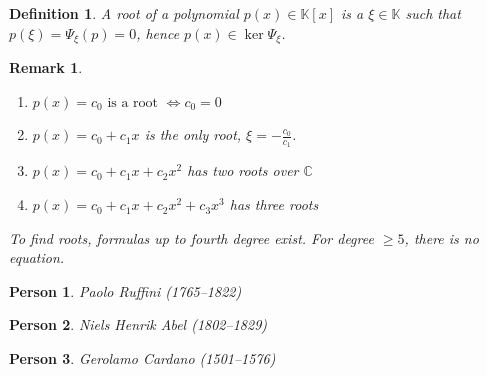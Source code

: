 \documentclass[a4paper]{article}
\newcounter{lecref}[section]
\numberwithin{lecref}{section}
\newtheorem{definition}[lecref]{Definition}
\newtheorem*{Remark}{Remark}
\newtheorem*{Person}{Person}
\begin{document}
\begin{definition}
  A \emph{root of a polynomial} $p(x) \in \mathbb K[x]$ is a $\xi \in \mathbb K$ such that $p(\xi) = \Psi_{\xi}(p) = 0$,
  hence $p(x) \in \ker{\Psi_{\xi}}$.
\end{definition}

\begin{Remark}
  \begin{enumerate}
    \item $p(x) = c_0 \text{ is a root } \iff c_0 = 0$
    \item $p(x) = c_0 + c_1 x$ is the only root, $\xi = -\frac{c_0}{c_1}$.
    \item $p(x) = c_0 + c_1 x + c_2 x^2$ has two roots over $\mathbb C$
    \item $p(x) = c_0 + c_1 x + c_2 x^2 + c_3 x^3$ has three roots
  \end{enumerate}

  To find roots, formulas up to fourth degree exist.
  For degree $\geq 5$, there is no equation.
\end{Remark}

\begin{Person}
  Paolo Ruffini (1765--1822)
\end{Person}
\begin{Person}
  Niels Henrik Abel (1802--1829)
\end{Person}
\begin{Person}
  Gerolamo Cardano (1501--1576)
\end{Person}
\end{document}
